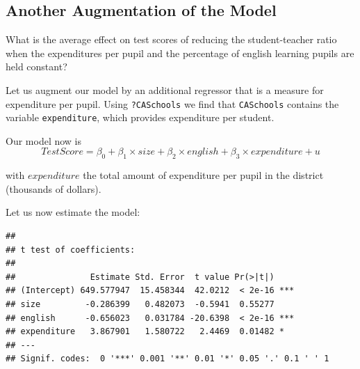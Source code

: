 \documentclass[]{book}
\newenvironment{Shaded}{\begin{snugshade}}{\end{snugshade}}
\newcommand{\KeywordTok}[1]{\textcolor[rgb]{0.13,0.29,0.53}{\textbf{#1}}}
\newcommand{\DataTypeTok}[1]{\textcolor[rgb]{0.13,0.29,0.53}{#1}}
\newcommand{\DecValTok}[1]{\textcolor[rgb]{0.00,0.00,0.81}{#1}}
\newcommand{\StringTok}[1]{\textcolor[rgb]{0.31,0.60,0.02}{#1}}
\newcommand{\CommentTok}[1]{\textcolor[rgb]{0.56,0.35,0.01}{\textit{#1}}}
\newcommand{\OperatorTok}[1]{\textcolor[rgb]{0.81,0.36,0.00}{\textbf{#1}}}
\newcommand{\NormalTok}[1]{#1}
\theoremstyle{definition}
\theoremstyle{definition}
\theoremstyle{definition}
\theoremstyle{remark}
\begin{document}
\subsection*{Another Augmentation of the
Model}\label{another-augmentation-of-the-model}

What is the average effect on test scores of reducing the
student-teacher ratio when the expenditures per pupil and the percentage
of english learning pupils are held constant?

Let us augment our model by an additional regressor that is a measure
for expenditure per pupil. Using \texttt{?CASchools} we find that
\texttt{CASchools} contains the variable \texttt{expenditure}, which
provides expenditure per student.

Our model now is
\[ TestScore = \beta_0 + \beta_1 \times size + \beta_2 \times english + \beta_3 \times expenditure + u \]

with \(expenditure\) the total amount of expenditure per pupil in the
district (thousands of dollars).

Let us now estimate the model:

\begin{Shaded}
\end{Shaded}

\begin{verbatim}
## 
## t test of coefficients:
## 
##               Estimate Std. Error  t value Pr(>|t|)    
## (Intercept) 649.577947  15.458344  42.0212  < 2e-16 ***
## size         -0.286399   0.482073  -0.5941  0.55277    
## english      -0.656023   0.031784 -20.6398  < 2e-16 ***
## expenditure   3.867901   1.580722   2.4469  0.01482 *  
## ---
## Signif. codes:  0 '***' 0.001 '**' 0.01 '*' 0.05 '.' 0.1 ' ' 1
\end{verbatim}
\end{document}
